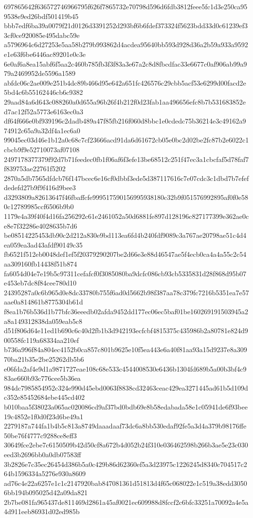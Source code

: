 {697865642f636572746966795f626f7865732e70798d596d6fdb3812feee5fc1d3e250ca959538e9ed26bdf501419b45
bbb7edf6ba39a0079f21d0126d3391252d293bf6b6fdef373324f5623bdd33d0c61239ef33cf0ce920085e495dabc59e
a5796964c6d27253e5aa58b279b993862d4acdea95640bb593d928d36a2b59a933a9592e1e63f6be6446ac89201e0c3e
6e0af6a8ea15abf6f5aa2c460b785fb3f3f83a3e67a2c8d8fbcdfac33e6677c0af906ab99a979a2469952de5596a1589
abfdc06c2ae009e251b4dc89b466d95e642a651fc426576c29cbb5acf53e6299d00facd2e5bd4c6b55162446cb6c9382
29aad84a6d643c088260a0d655a96b26f4b212f0d23fab1aa496656efc8b7b531683852ed7ac12f52a5773e6163ec0a3
df64f666e0bf939196c2dadb489a47f85fb216f060d8bbc1e0cdedc75b36214e3c49162a974912c65a9a32df4a1ec6a0
99045ec03d46e1b12a0c68c7cf23666acd91da6d61672cb05e0bc2d02be2fc87b2e6022c1cbcb9f9e52710073af07108
2497178377379f92d7b71feedec0fb1f06af6f3efe13be68512c251f47ec3a1cbcfaf5d78faf7f839753ae22761f5202
2870a5db7565dfdcb76f147bcec6e16cf0dbbf3ede5d387117616c7e07cdc3c1dbd7b7efefdedefd27b9f9f416d9bee3
d3293809a82613647f46fbaffcfe999517590156995938180c32b9f051576992895af0f0e580c12789985ccf6506b9b0
1179e4a39f40f4d16fa256292c61e2461052a50d6881fe897d128196c827177399e362ae0ce8e7f32286e4028635b7d6
be08514225453db90c2d212a830e9bd113ea6fd4b240fdf9089c3a767ae20798ae51c4d4ea059ea3ad43afdf90149c35
fb6521f512eb0048def1ef5f20379290207be2d66e3e88d46547ae5f4ecb0ca4a4a55c2c54aa309160fb14438f51b874
fa6054d04e7e19b5c97311cefafcf0f3085080ba9dcfc086cb93cb5335831d28f868d95b07e453eb7dc8f84cee780d10
24395287a0c6b965d0e8dc33780b755f6ad0d5662b98f387aa78c379fc7216b5351ea7e57aae0a814861b8775304b61d
f8ea1b76b536d1b77bfc36eeedb02afda9452dd177ec06ec5baf01be160269191503945a2a8a149312838da059eab5c8
d51f806d64e11ed1b690c6c40d2fb1b3d942193ecfcbf4815375c435986b2a80781e824d900558fc119a68334aa210ef
b736a996f84a804ec4152b0ca857c801b9625e10f5ea443e6a40f81aa93a15d9237e8a30970ba21b35e2be25262db5b6
e06fda2af4e9d1a9871727eae108c68e533c4544008530e6436b1304fd689b5a00b3bf4c983ae660b93c776cee5b36ea
984dc7985854952c324e990d45ebd0063f8838cd32463ceac429ea3271445ad61b5d109dc352e85452684ebe445cd402
b010baa5f38023a065ac020086cd9af37bd0bdb69e8b58edabada58e1c05941de6f93bee19c4852e1f0d0f23d6be49a1
2279187a744fa1b4b5c813a8749daaadaaf73dc6a8bb530edaf92fe5a3d4a379b98176ffe50be76f4777c9288ce8eff3
30649fce2ebe7c6150509b42d50cf8a672b4d052b24f310e036462598b266b3ae5e23c030eed3b2696bb0a0db07583ff
3b2826e7c35ec26454d386b5a0c429b86d62360ef5a3d23975c1226245d8340c704517c264b1596334a5276e930a8609
ad76c4e22a6257e1c1c2147920bab847081361d51813d4f65c068022e1c519a38edd30506bb194b095025d42a09da821
2b7be081fa965437de811469d2861a45af0021ec609988d8fccf2c6bfc33251a70092a4e5a4d911eeb86931d02ed985b
}
